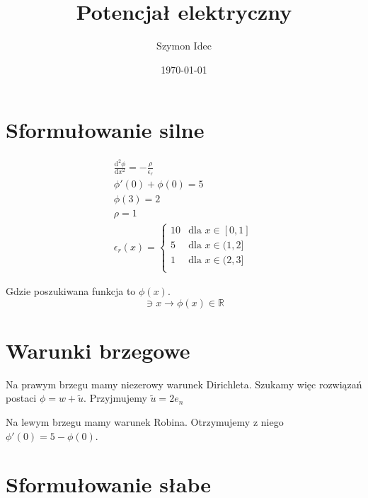 \documentclass[12pt,a4paper]{mwart}
\begin{document}
\title{Potencjał elektryczny}
\author{Szymon Idec}
\date{\today}
\maketitle

\section{Sformułowanie silne}
\begin{equation*}
    \begin{gathered}
    \frac{\mathrm{d}^2\phi}{\mathrm{d}x^2} = -\frac{\rho}{\epsilon_r} \\
    \phi'(0) + \phi(0) = 5 \\
    \phi(3) = 2 \\
    \rho = 1 \\
    \epsilon_r(x) =
        \begin{cases}
            10 & \text{dla $x \in [0, 1]$} \\
            5  & \text{dla $x \in (1, 2]$} \\
            1  & \text{dla $x \in (2, 3]$} \\
        \end{cases}
    \end{gathered}
\end{equation*}

Gdzie poszukiwana funkcja to $\phi(x)$.
\begin{equation*}
    [0, 3] \ni x \rightarrow \phi(x) \in \mathbb{R}
\end{equation*}

\newpage

\section{Warunki brzegowe}
Na prawym brzegu mamy niezerowy warunek Dirichleta. Szukamy więc rozwiązań postaci $\phi = w + \widetilde{u}$.
Przyjmujemy $\widetilde{u} = 2e_n$

Na lewym brzegu mamy warunek Robina. Otrzymujemy z niego $\phi'(0) = 5 - \phi(0)$.


\section{Sformułowanie słabe}
\end{document}
